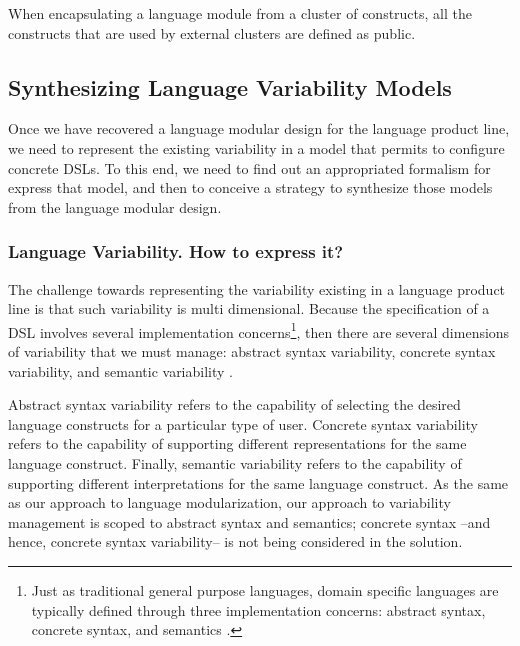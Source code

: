 When encapsulating a language module from a cluster of constructs, all the constructs that are used by external clusters are defined as public.



\subsection{Synthesizing Language Variability Models}

Once we have recovered a language modular design for the language product line, we need to represent the existing variability in a model that permits to configure concrete DSLs. To this end, we need to find out an appropriated formalism for express that model, and then to conceive a strategy to synthesize those models from the language modular design. 

\subsubsection{Language Variability. \textbf{How to express it?}}

The challenge towards representing the variability existing in a language product line is that such variability is multi dimensional. Because the specification of a DSL involves several implementation concerns\footnote{Just as traditional general purpose languages, domain specific languages are typically defined through three implementation concerns: abstract syntax, concrete syntax, and semantics \cite{Harel:2004b}.}, then there are several dimensions of variability that we must manage: abstract syntax variability, concrete syntax variability, and semantic variability \cite{Cengarle:2009,Gronniger:2011}.

Abstract syntax variability refers to the capability of selecting the desired language constructs for a particular type of user. Concrete syntax variability refers to the capability of supporting different representations for the same language construct. Finally, semantic variability refers to the capability of supporting different interpretations for the same language construct. As the same as our approach to language modularization, our approach to variability management is scoped to abstract syntax and semantics; concrete syntax --and hence, concrete syntax variability-- is not being considered in the solution. 

